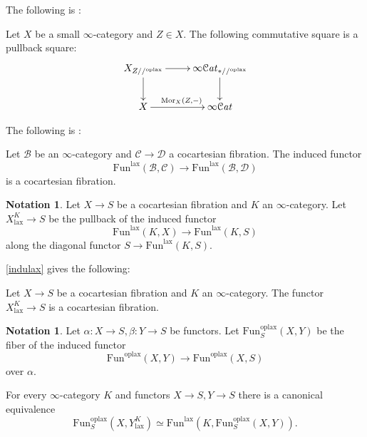 \documentclass[10pt,oneside]{article}
\numberwithin{equation}{section} %
\numberwithin{figure}{section} %
\theoremstyle{plain}
\theoremstyle{definition}
\newtheorem{notation}[thm]{Notation}
\newcommand{\mB}{{\mathcal B}}
\newcommand{\mC}{{\mathcal C}}
\newcommand{\mD}{{\mathcal D}}
\newcommand{\X}{X}
\newcommand{\Fun}{\mathrm{Fun}}
\newcommand{\lax}{{\mathrm{lax}}}
\newcommand{\oplax}{{\mathrm{oplax}}}
\newcommand{\Mor}{{\mathrm{Mor}}}
\newcommand{\scat}{\mathcal{C}\mathit{at}}
\begin{document}
The following is \cite[Lemma 4.6.8.]{gepner2026fibrations}:

\begin{lemma}\label{Grorep}
Let $X$ be a small $\infty$-category and $Z \in X.$
The following commutative square is a pullback square:
$$
\begin{xy}
\xymatrix{
X_{Z //^\oplax} \ar[d] \ar[r]
& \infty\scat_{*//^\oplax } \ar[d]
\\ 
X  \ar[r]^{\Mor_\X(Z,-)} & \infty\scat
}
\end{xy}$$

\end{lemma}

The following is \cite[Corollary 4.2.7.]{gepner2026fibrations}:

\begin{corollary}\label{indulax}

Let $\mB$ be an $\infty$-category and $\mC \to \mD$ a cocartesian fibration. The induced functor
$$\Fun^\lax(\mB, \mC) \to \Fun^\lax(\mB, \mD) $$
is a cocartesian fibration.

  
\end{corollary}

\begin{notation}
Let $X \to S$ be a cocartesian fibration
and $K$ an $\infty$-category.
Let $X^K_\lax \to S $ be the pullback of the induced functor
$$ \Fun^\lax(K,X) \to \Fun^\lax(K,S) $$
along the diagonal functor $S \to \Fun^\lax(K,S). $

\end{notation}

\cref{indulax} gives the following:

\begin{corollary}\label{restcoca}

Let $X \to S$ be a cocartesian fibration
and $K$ an $\infty$-category.
The functor $X^K_\lax \to S $ is a cocartesian fibration.
   
\end{corollary}

\begin{notation}
Let $\alpha: X \to S, \beta: Y \to S$ be functors.
Let $\Fun^\oplax_S(X,Y)$ be the fiber of the induced functor
$$ \Fun^\oplax(X,Y) \to \Fun^\oplax(X,S)$$ over $\alpha.$
    
\end{notation}

\begin{remark}\label{univeqr}
    
For every $\infty$-category $K$ and functors $X \to S, Y \to S$ there is a canonical equivalence
$$ \Fun^\oplax_S(X,Y^K_\lax) \simeq \Fun^\lax(K,\Fun^\oplax_S(X,Y)).$$
\end{remark}
\end{document}
